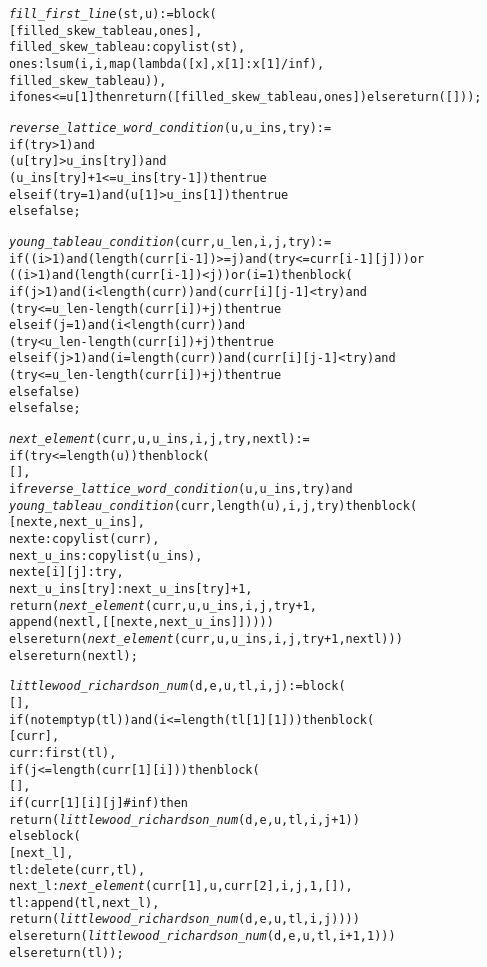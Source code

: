 \begin{alltt}
\emph{fill\_first\_line} (st, u) := block (
  [filled\_skew\_tableau, ones],
  filled\_skew\_tableau : copylist (st),
  ones : lsum (i, i, map (lambda ([x], x[1] : x[1]/inf),
               filled\_skew\_tableau)),
  if ones <= u[1] then return ([filled\_skew\_tableau, ones]) else return ([]));

\emph{reverse\_lattice\_word\_condition} (u, u\_ins, try) :=
if (try > 1) and
   (u[try] > u\_ins[try]) and
   (u\_ins[try] + 1 <= u\_ins [try-1]) then true
else if (try = 1) and (u[1] > u\_ins[1]) then true
else false;

\emph{young\_tableau\_condition} (curr, u\_len, i, j, try) :=
if ((i>1) and (length(curr[i-1])>=j) and (try<=curr[i-1][j])) or
   ((i>1) and (length(curr[i-1])<j)) or (i=1) then block (
  if (j>1) and (i<length(curr)) and (curr[i][j-1]<try) and
     (try<=u\_len-length(curr[i])+j) then true
  else if (j=1) and (i<length(curr)) and
          (try<u\_len-length(curr[i])+j) then true
  else if (j>1) and (i=length(curr)) and (curr[i][j-1]<try) and
          (try<=u\_len-length(curr[i])+j) then true
  else false)
else false;

\emph{next\_element} (curr, u, u\_ins, i, j, try, nextl) :=
if (try <= length (u)) then block (
  [],
  if \emph{reverse\_lattice\_word\_condition} (u, u\_ins, try) and
     \emph{young\_tableau\_condition} (curr, length (u), i, j, try) then block (
    [nexte, next\_u\_ins],
    nexte : copylist (curr),
    next\_u\_ins : copylist (u\_ins),
    nexte[i][j] : try,
    next\_u\_ins[try] : next\_u\_ins[try] + 1,
    return (\emph{next\_element} (curr, u, u\_ins, i, j, try + 1,
                          append (nextl, [[nexte, next\_u\_ins]]))))
  else return (\emph{next\_element} (curr, u, u\_ins, i, j, try + 1, nextl)))
else return (nextl); 

\emph{littlewood\_richardson\_num} (d, e, u, tl, i, j) := block (
  [],
  if (not emptyp (tl)) and (i <= length (tl[1][1]))then block (
    [curr],
    curr : first (tl),
    if (j <= length (curr[1][i])) then block (
      [],
      if (curr[1][i][j] # inf) then
         return (\emph{littlewood\_richardson\_num} (d, e, u, tl, i, j+1))
      else block (
        [next\_l],
        tl : delete (curr, tl),
        next\_l : \emph{next\_element} (curr[1], u, curr[2], i, j, 1, []),
        tl : append (tl, next\_l),
        return (\emph{littlewood\_richardson\_num} (d, e, u, tl, i, j))))
    else return (\emph{littlewood\_richardson\_num} (d, e, u, tl, i+1, 1)))
  else return (tl));
\end{alltt}
